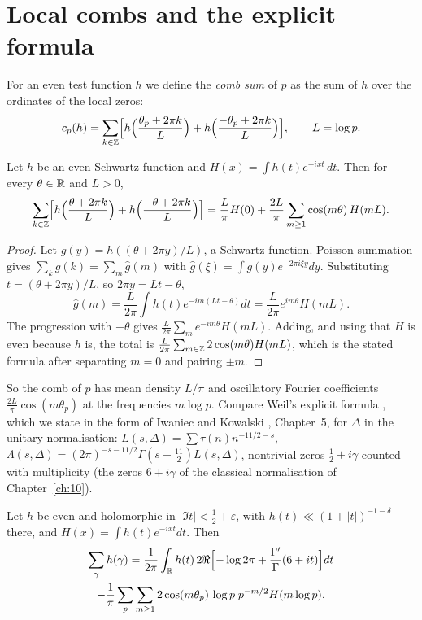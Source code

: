\section{Local combs and the explicit formula}\label{sec:10ccombs}

For an even test function $h$ we define the \emph{comb sum} of $p$ as the sum of $h$ over the ordinates of the local zeros:
\[
c_p(h)=\sum_{k\in\mathbb{Z}}\Bigl[h\Bigl(\frac{\theta_p+2\pi k}{L}\Bigr)+h\Bigl(\frac{-\theta_p+2\pi k}{L}\Bigr)\Bigr],\qquad L=\log p .
\]

\begin{lemma}\label{lem:10cpoisson}
Let $h$ be an even Schwartz function and $H(x)=\int h(t)e^{-ixt}\,dt$. Then for every $\theta\in\mathbb{R}$ and $L>0$,
\[
\sum_{k\in\mathbb{Z}}\Bigl[h\Bigl(\frac{\theta+2\pi k}{L}\Bigr)+h\Bigl(\frac{-\theta+2\pi k}{L}\Bigr)\Bigr]=\frac{L}{\pi}H(0)+\frac{2L}{\pi}\sum_{m\ge1}\cos(m\theta)\,H(mL).
\]
\end{lemma}

\begin{proof}
Let $g(y)=h((\theta+2\pi y)/L)$, a Schwartz function. Poisson summation gives $\sum_kg(k)=\sum_m\hat g(m)$ with $\hat g(\xi)=\int g(y)e^{-2\pi i\xi y}dy$. Substituting $t=(\theta+2\pi y)/L$, so $2\pi y=Lt-\theta$,
\[
\hat g(m)=\frac{L}{2\pi}\int h(t)e^{-im(Lt-\theta)}dt=\frac{L}{2\pi}e^{im\theta}H(mL).
\]
The progression with $-\theta$ gives $\frac{L}{2\pi}\sum_me^{-im\theta}H(mL)$. Adding, and using that $H$ is even because $h$ is, the total is $\frac{L}{2\pi}\sum_{m\in\mathbb{Z}}2\cos(m\theta)H(mL)$, which is the stated formula after separating $m=0$ and pairing $\pm m$.
\end{proof}

So the comb of $p$ has mean density $L/\pi$ and oscillatory Fourier coefficients $\frac{2L}{\pi}\cos(m\theta_p)$ at the frequencies $m\log p$. Compare Weil's explicit formula \cite{weil1952}, which we state in the form of Iwaniec and Kowalski \cite{iwanieckowalski2004}, Chapter~5, for $\Delta$ in the unitary normalisation: $L(s,\Delta)=\sum\tau(n)n^{-11/2-s}$, $\Lambda(s,\Delta)=(2\pi)^{-s-11/2}\Gamma(s+\frac{11}{2})L(s,\Delta)$, nontrivial zeros $\frac12+i\gamma$ counted with multiplicity (the zeros $6+i\gamma$ of the classical normalisation of Chapter~\ref{ch:10}).

\begin{theorem}\label{thm:10cexplicit}
Let $h$ be even and holomorphic in $|\Im t|<\frac12+\varepsilon$, with $h(t)\ll(1+|t|)^{-1-\delta}$ there, and $H(x)=\int h(t)e^{-ixt}dt$. Then
\begin{multline*}
\sum_\gamma h(\gamma)=\frac{1}{2\pi}\int_{\mathbb{R}}h(t)\,2\Re\Bigl[-\log2\pi+\frac{\Gamma'}{\Gamma}(6+it)\Bigr]dt\\
-\frac1\pi\sum_p\sum_{m\ge1}2\cos(m\theta_p)\,\log p\;p^{-m/2}H(m\log p).
\end{multline*}
\end{theorem}


